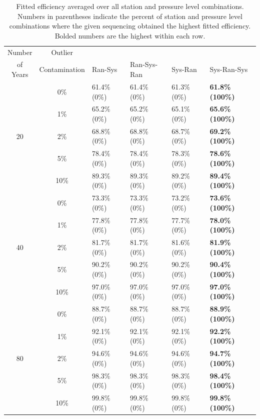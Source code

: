 \documentclass[12pt]{article}
\begin{document}
\begin{landscape}
\begin{table}[ht]
	\centering
	\begin{tabular}{cc|llll}
		\hline
		Number & Outlier & & & &\\ 
		of Years & Contamination & Ran-Sys & Ran-Sys-Ran & Sys-Ran & Sys-Ran-Sys\\ 
		\hline
		 & 0\% & 61.4\% (0\%) & 61.4\% (0\%) & 61.3\% (0\%) & \textbf{61.8\% (100\%)} \\ 
  		 & 1\% & 65.2\% (0\%) & 65.2\% (0\%) & 65.1\% (0\%) & \textbf{65.6\% (100\%)} \\ 
  		20 & 2\% & 68.8\% (0\%) & 68.8\% (0\%) & 68.7\% (0\%) & \textbf{69.2\% (100\%)} \\ 
  		 & 5\% & 78.4\% (0\%) & 78.4\% (0\%) & 78.3\% (0\%) & \textbf{78.6\% (100\%)} \\ 
  		 & 10\% & 89.3\% (0\%) & 89.3\% (0\%) & 89.2\% (0\%) & \textbf{89.4\% (100\%)} \\ 
  		\hline
  		 & 0\% & 73.3\% (0\%) & 73.3\% (0\%) & 73.2\% (0\%) & \textbf{73.6\% (100\%)} \\ 
  		 & 1\% & 77.8\% (0\%) & 77.8\% (0\%) & 77.7\% (0\%) & \textbf{78.0\% (100\%)} \\ 
  		40 & 2\% & 81.7\% (0\%) & 81.7\% (0\%) & 81.6\% (0\%) & \textbf{81.9\% (100\%)} \\ 
  		 & 5\% & 90.2\% (0\%) & 90.2\% (0\%) & 90.2\% (0\%) & \textbf{90.4\% (100\%)} \\ 
  		 & 10\% & 97.0\% (0\%) & 97.0\% (0\%) & 97.0\% (0\%) & \textbf{97.0\% (100\%)} \\ 
  		\hline
  		 & 0\% & 88.7\% (0\%) & 88.7\% (0\%) & 88.7\% (0\%) & \textbf{88.9\% (100\%)} \\ 
  		 & 1\% & 92.1\% (0\%) & 92.1\% (0\%) & 92.1\% (0\%) & \textbf{92.2\% (100\%)} \\ 
  		80 & 2\% & 94.6\% (0\%) & 94.6\% (0\%) & 94.6\% (0\%) & \textbf{94.7\% (100\%)} \\ 
  		 & 5\% & 98.3\% (0\%) & 98.3\% (0\%) & 98.3\% (0\%) & \textbf{98.4\% (100\%)} \\ 
  		 & 10\% & 99.8\% (0\%) & 99.8\% (0\%) & 99.8\% (0\%) & \textbf{99.8\% (100\%)} \\ 
  		\hline
	\end{tabular}
	\caption{Fitted efficiency averaged over all station and pressure level combinations.  Numbers in parentheses indicate the percent of station and pressure level combinations where the given sequencing obtained the highest fitted efficiency. Bolded numbers are the highest within each row.}
	\label{tab:fitEff}
\end{table}
\end{landscape}
\end{document}
